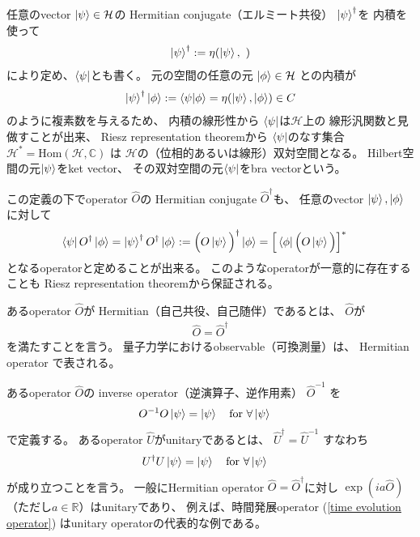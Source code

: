 任意のvector $\ket{\psi} \in \mathcal{H}$の
Hermitian conjugate（エルミート共役） $\ket{\psi}^\dagger$を
内積を使って
\begin{align}
    \ket{\psi}^\dagger
    :=
    \eta(\ket{\psi},\ )
\label{bra vector}
\end{align}
により定め、$\bra{\psi}$とも書く。
元の空間の任意の元
$\ket{\phi} \in \mathcal{H}$
との内積が
\begin{align}
    \ket{\psi}^\dagger \ket{\phi}
    :=
    \braket{\psi|\phi}
    = \eta(\ket{\psi}, \ket{\phi})
    \in C
\end{align}
のように複素数を与えるため、
内積の線形性から
$\bra{\psi}$は$\mathcal{H}$上の
線形汎関数と見做すことが出来、
Riesz representation theoremから
$\bra{\psi}$のなす集合
$\mathcal{H}^* = \mathrm{Hom} (\mathcal{H}, \mathbb{C})$
は
$\mathcal{H}$の（位相的あるいは線形）双対空間となる。
Hilbert空間の元$\ket{\psi}$をket vector、
その双対空間の元$\bra{\psi}$をbra vectorという。

この定義の下でoperator $\hat{O}$の
Hermitian conjugate $\hat{O}^\dagger$も、
任意のvector $\ket{\psi}, \ket{\phi}$に対して
\begin{align}
    \bra{\psi}
    O^\dagger
    \ket{\phi}
    =
    \ket{\psi}^\dagger
    O^\dagger
    \ket{\phi}
    &:=
    \Big( O \ket{\psi} \Big)^\dagger
    \ket{\phi}
    =
    \Big[
        \bra{\phi} \Big( O \ket{\psi} \Big)
    \Big]^*
\end{align}
となるoperatorと定めることが出来る。
このようなoperatorが一意的に存在することも
Riesz representation theoremから保証される。

あるoperator $\hat{O}$が
Hermitian（自己共役、自己随伴）であるとは、
$\hat{O}$が
\begin{align}
    \hat{O} = \hat{O}^\dagger
\end{align}
を満たすことを言う。
量子力学におけるobservable（可換測量）は、
Hermitian operator で表される。

あるoperator $\hat{O}$の
inverse operator（逆演算子、逆作用素）
$\hat{O}^{-1}$
を
\begin{align}
    O^{-1} O \ket{\psi} &= \ket{\psi}
    \quad\text{for $\forall \ket{\psi}$}
\end{align}
で定義する。
あるoperator $\hat{U}$がunitaryであるとは、
$ \hat{U}^\dagger = \hat{U}^{-1} $
すなわち
\begin{align}
    U^\dagger U \ket{\psi} &= \ket{\psi}
    \quad\text{for $\forall \ket{\psi}$}
\label{unitary operator}
\end{align}
が成り立つことを言う。
一般にHermitian operator $\hat{O} = \hat{O}^\dagger$に対し
$\exp( i a \hat{O})$（ただし$a \in \mathbb{R}$）はunitaryであり、
例えば、時間発展operator
(\ref{time evolution operator})
はunitary operatorの代表的な例である。

